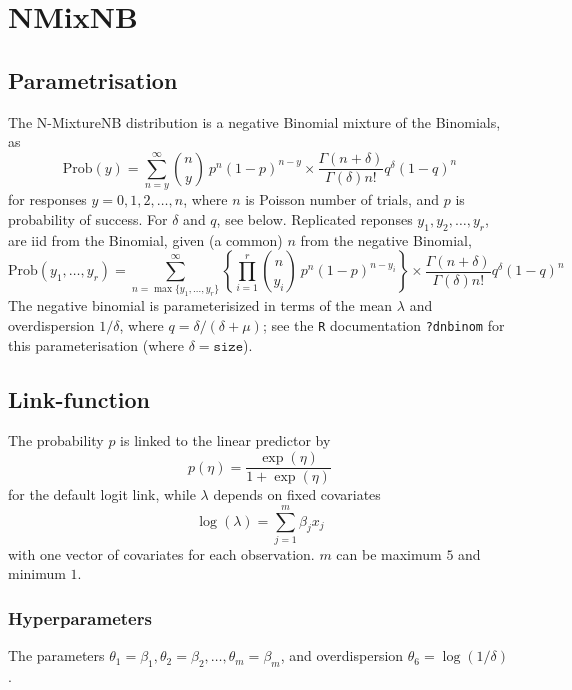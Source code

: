 \documentclass[a4paper,11pt]{article}
\def\mmax{5}
\def\mmaxp1{6}
\begin{document}
\section*{NMixNB}

\subsection*{Parametrisation}

The N-MixtureNB distribution is a negative Binomial mixture of the Binomials, as
\begin{displaymath}
    \text{Prob}(y) = \sum_{n=y}^{\infty} {n \choose y} \ p^n
    (1-p)^{n-y} \times \frac{\Gamma(n + \delta)}{\Gamma(\delta) n!}
    q^{\delta}(1-q)^{n}
\end{displaymath}
for responses $y=0, 1, 2, \ldots,n$, where $n$ is Poisson number of
trials, and $p$ is probability of success. For $\delta$ and $q$, see below.
Replicated reponses
$y_1, y_2, \ldots, y_r$, are iid from the Binomial, given (a common)
$n$ from the negative Binomial,
\begin{displaymath}
    \text{Prob}(y_1, \ldots, y_r) = \sum_{n=\max\{y_1, \ldots,
        y_r\}}^{\infty} \left\{\prod_{i=1}^{r}
    {n \choose y_i} \ p^n
    (1-p)^{n-y_i}\right\} \times \frac{\Gamma(n + \delta)}{\Gamma(\delta) n!}
    q^{\delta}(1-q)^{n}
\end{displaymath}
The negative binomial is parameterisized in terms of the mean
$\lambda$ and overdispersion $1/\delta$, where
$q = \delta/(\delta + \mu)$; see the \texttt{R} documentation
\texttt{?dnbinom} for this parameterisation (where $\delta=\texttt{size}$).

\subsection*{Link-function}

The probability $p$ is linked to the linear predictor by
\begin{displaymath}
    p(\eta) = \frac{\exp(\eta)}{1+\exp(\eta)}
\end{displaymath}
for the default logit link, while $\lambda$ depends on fixed
covariates
\begin{displaymath}
    \log(\lambda) = \sum_{j=1}^{m} \beta_j x_j
\end{displaymath}
with one vector of covariates for each observation. $m$ can be maximum
$\mmax$ and minimum $1$.

\subsubsection*{Hyperparameters}
The parameters
$\theta_1=\beta_1, \theta_2=\beta_2, \ldots, \theta_m=\beta_m$, and
overdispersion $\theta_{\mmaxp1} = \log(1/\delta)$.
\end{document}
